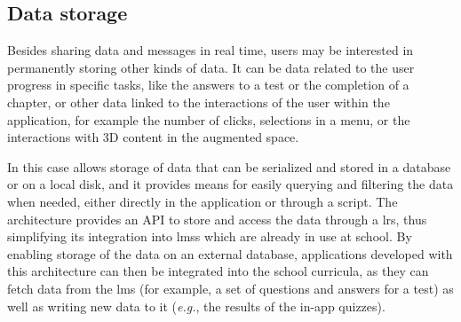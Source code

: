 

\subsection{Data storage}\label{arch:architecture:logging}

Besides sharing data and messages in real time, users may be interested in permanently storing other kinds of data. It can be data related to the user progress in specific tasks, like the answers to a test or the completion of a chapter, or other data linked to the interactions of the user within the application, for example the number of clicks, selections in a menu, or the interactions with 3D content in the augmented space.

In this case \arch{} allows storage of data that can be serialized and stored in a database or on a local disk, and it provides means for easily querying and filtering the data when needed, either directly in the application or through a script. The architecture provides an API to store and access the data through a \gls{lrs}, thus simplifying its integration into \glspl{lms} which are already in use at school. By enabling storage of the data on an external database, applications developed with this architecture can then be integrated into the school curricula, as they can fetch data from the \gls{lms} (for example, a set of questions and answers for a test) as well as writing new data to it (\textit{e.g.}, the results of the in-app quizzes).

